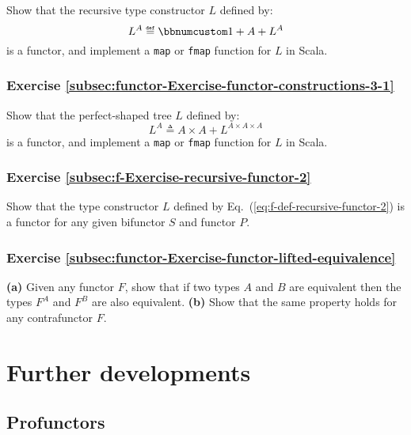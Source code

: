 Show that the recursive type constructor $L$ defined by:
\[
L^{A}\triangleq\bbnum 1+A+L^{A}
\]
is a functor, and implement a \lstinline!map! or \lstinline!fmap!
function for $L$ in Scala.

\subsubsection{Exercise \label{subsec:functor-Exercise-functor-constructions-3-1}\ref{subsec:functor-Exercise-functor-constructions-3-1}}

Show that the perfect-shaped tree $L$ defined by:
\[
L^{A}\triangleq A\times A+L^{A\times A\times A}
\]
is a functor, and implement a \lstinline!map! or \lstinline!fmap!
function for $L$ in Scala.

\subsubsection{Exercise \label{subsec:f-Exercise-recursive-functor-2}\ref{subsec:f-Exercise-recursive-functor-2}}

Show that the type constructor $L$ defined by Eq.~(\ref{eq:f-def-recursive-functor-2})
is a functor for any given bifunctor $S$ and functor $P$. 

\subsubsection{Exercise \label{subsec:functor-Exercise-functor-lifted-equivalence}\ref{subsec:functor-Exercise-functor-lifted-equivalence}}

\textbf{(a)} Given any functor $F$, show that if two types $A$ and
$B$ are equivalent then the types $F^{A}$ and $F^{B}$ are also
equivalent. \textbf{(b)} Show that the same property holds for any
contrafunctor $F$.

\section{Further developments}

\subsection{Profunctors\label{subsec:f-Profunctors}}

